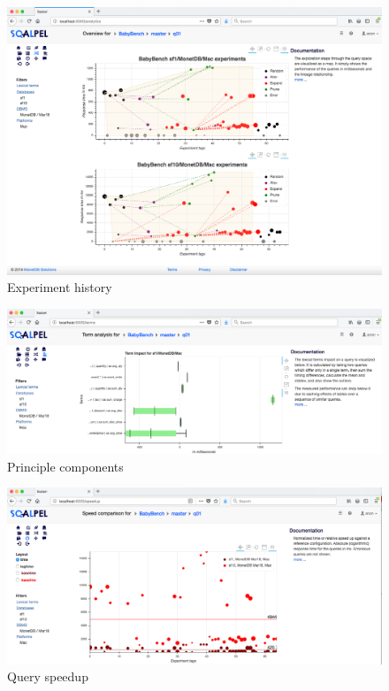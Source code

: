 \documentclass{cidr-2019}
\begin{document}

\begin{figure}[t!]
\centering
\includegraphics[width=\textwidth]{Figures/history2.png}
\caption{Experiment history
	\label{fig:history}}
\end{figure}



\begin{figure}[t!]
\centering
\includegraphics[width=\textwidth]{Figures/components2.png}
\caption{Principle components
	\label{fig:components}}
\end{figure}




\begin{figure}[t!]
\centering
\includegraphics[width=\textwidth]{Figures/speedup3.png}
\caption{Query speedup
	\label{fig:speedup2}}
\end{figure}
\end{document}
